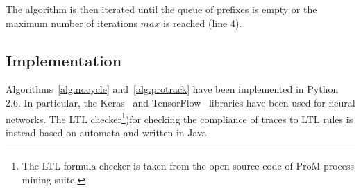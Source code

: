 The algorithm is then iterated until the queue of prefixes is empty or the maximum number of iterations $max$ is reached (line 4).












\subsection{Implementation}
\label{ssec:implementation}
Algorithms~\ref{alg:nocycle} and~\ref{alg:protrack} have been implemented in Python 2.6. In particular, the Keras~\cite{chollet2015keras} and TensorFlow~\cite{tensorflow2015-whitepaper} libraries have been used for neural networks. The LTL\cite{vanderAalst2005} checker\footnote{The LTL formula checker is taken from the open source code of ProM process mining suite.})for checking the compliance of traces to LTL rules is instead based on automata and written in Java. 

